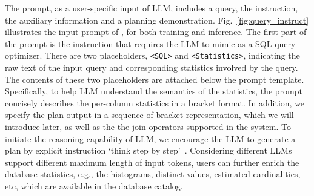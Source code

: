 The prompt, as a user-specific input of LLM, includes a query, the instruction, the auxiliary information and a planning demonstration.
Fig.~\ref{fig:query_instruct} illustrates the input prompt of \LLMQO, for both training and inference. The first part of the prompt is the instruction that requires the LLM to mimic as a SQL query optimizer. 
There are two placeholders, {\color{Orchid}\texttt{<SQL>}} and {\color{BlueGreen} \texttt{<Statistics>}}, indicating the raw text of the input query and corresponding statistics involved by the query.  
The contents of these two placeholders are attached below the prompt template. 
Specifically, to help LLM understand the semantics of the statistics, the prompt concisely describes the per-column statistics in a bracket format. In addition, we specify the plan output in a sequence of bracket representation, which we will introduce later, as well as the the join operators supported in the system. 
To initiate the reasoning capability of LLM, we encourage the LLM to generate a plan by  explicit instruction `think step by step'~\cite{DBLP:conf/nips/KojimaGRMI22}. 
Considering different LLMs support different maximum length of input tokens, users can further enrich the database statistics, e.g., the histograms, distinct values, estimated 
cardinalities, etc, which are available in the database catalog. 

